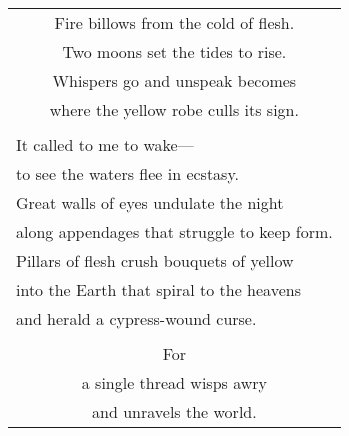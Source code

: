 \documentclass{article}
\begin{document}
\begin{center}
\begin{tabular}{l}
\multicolumn{1}{c}{Fire billows from the cold of flesh.} \\
\multicolumn{1}{c}{Two moons set the tides to rise.} \\
\multicolumn{1}{c}{Whispers go and unspeak becomes} \\
\multicolumn{1}{c}{where the yellow robe culls its sign.} \\
\\
It called to me to wake--- \\
to see the waters flee in ecstasy. \\
Great walls of eyes undulate the night \\
along appendages that struggle to keep form. \\
Pillars of flesh crush bouquets of yellow \\
into the Earth that spiral to the heavens \\
and herald a cypress-wound curse. \\
\\
\multicolumn{1}{c}{For} \\
\multicolumn{1}{c}{a single thread wisps awry} \\
\multicolumn{1}{c}{and unravels the world.} \\
\end{tabular}
\end{center}
\end{document}
